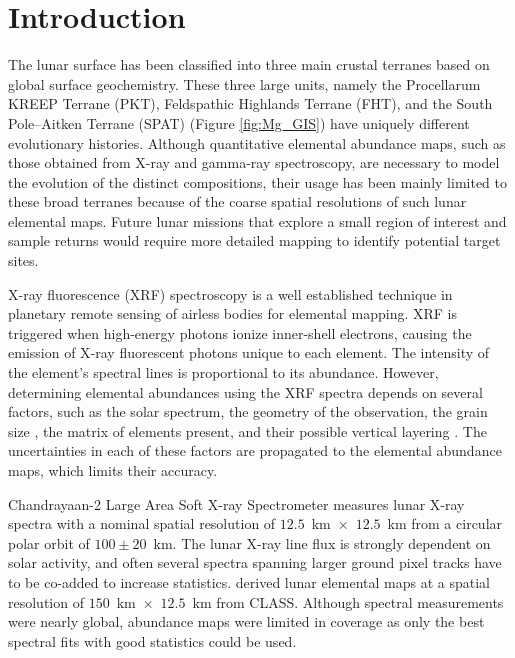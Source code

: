 \documentclass[twocolumn,linenumbers]{aastex631}
\newcommand{\revone}[1]{#1}
\begin{document}
\section{Introduction} \label{sec:intro}
The lunar surface has been classified into three main crustal terranes \citep{2000JGR...105.4197J} based on global surface geochemistry. These three large units, namely the Procellarum KREEP Terrane (PKT), Feldspathic Highlands Terrane (FHT), and the South Pole--Aitken Terrane (SPAT) \revone{(Figure \ref{fig:Mg_GIS})} have uniquely different evolutionary histories.  Although quantitative elemental abundance maps, such as those obtained from X-ray and gamma-ray spectroscopy, are necessary to model the evolution of the distinct compositions, their usage has been mainly limited to these broad terranes because of the coarse spatial resolutions of such lunar elemental maps. Future lunar missions that explore a small region of interest and sample returns would require more detailed mapping to identify potential target sites. 

X-ray fluorescence (XRF) spectroscopy is a well established technique in planetary remote sensing of airless bodies \citep{1972Sci...175..436A, adler1972, 2009Icar..200..129L, 2009P&SS...57..744S, 2011Icar..214...53N, 2011Sci...333.1847N,2014Icar..229..254W,2016RAA....16....4D} for elemental mapping.  XRF is triggered when high-energy photons ionize inner-shell electrons, causing the emission of X-ray fluorescent photons unique to each element. The intensity of the element's spectral lines is proportional to its abundance. However, determining elemental abundances using the XRF spectra  depends on several factors, such as the solar spectrum, the geometry of the observation, the grain size , the matrix of elements present, and their possible vertical layering \citep{1966JaJAP...5..886S, 1979PhDT.......224C,1997JGR...10216361C,1997LPI....28.1039O,2008EP&S...60..293M,2008EPS...60..283O,2008Icar..198..408N,2009AdSpR..44..313N,2011P&SS...59.1393W, ATHIRAY2013188, 2013PSS...89..183A}. The uncertainties in each of these factors are propagated to the elemental abundance maps, which limits their accuracy. 

Chandrayaan-2 Large Area Soft X-ray Spectrometer \citep[CLASS;][]{vatedka2020chandrayaan} measures lunar X-ray spectra with a nominal spatial resolution of $12.5$~km~$\times$~$12.5$~km from a circular polar orbit of $100 \pm 20$~km. The lunar X-ray line flux is strongly dependent on solar activity, and often several spectra spanning larger ground pixel tracks have to be co-added to increase statistics. \citet{2024Icar..41015898N} derived lunar elemental maps at a spatial resolution of $150$~km~$\times$~$12.5$~km from CLASS. Although spectral measurements were nearly global, abundance maps were limited in coverage as only the best spectral fits with good statistics could be used. 
\end{document}
